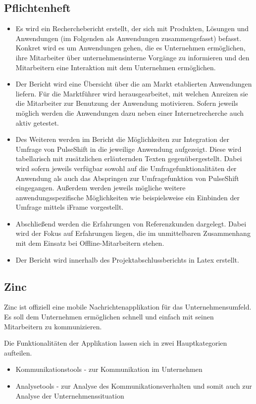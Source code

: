 \subsection{Pflichtenheft}
\begin{itemize}
\item Es wird ein Recherchebericht erstellt, der sich mit Produkten, Lösungen und Anwendungen (im Folgenden als Anwendungen zusammengefasst) befasst. Konkret wird es um Anwendungen gehen, die es Unternehmen ermöglichen, ihre Mitarbeiter über unternehmensinterne Vorgänge zu informieren und den Mitarbeitern eine Interaktion mit dem Unternehmen ermöglichen.
\item Der Bericht wird eine Übersicht über die am Markt etablierten Anwendungen liefern. Für die Marktführer wird herausgearbeitet, mit welchen Anreizen sie die Mitarbeiter zur Benutzung der Anwendung motivieren. Sofern jeweils möglich werden die Anwendungen dazu neben einer Internetrecherche auch aktiv getestet.
\item Des Weiteren werden im Bericht die Möglichkeiten zur Integration der Umfrage von PulseShift in die jeweilige Anwendung aufgezeigt. Diese wird tabellarisch mit zusätzlichen erläuternden Texten gegenübergestellt. Dabei wird sofern jeweils verfügbar sowohl auf die Umfragefunktionalitäten der Anwendung als auch das Abspringen zur Umfragefunktion von PulseShift eingegangen. Außerdem werden jeweils mögliche weitere anwendungsspezifische Möglichkeiten wie beispielsweise ein Einbinden der Umfrage mittels iFrame vorgestellt.
\item Abschließend werden die Erfahrungen von Referenzkunden dargelegt. Dabei wird der Fokus auf Erfahrungen liegen, die im unmittelbaren Zusammenhang mit dem Einsatz bei Offline-Mitarbeitern stehen.
\item Der Bericht wird innerhalb des Projektabschlussberichts in Latex erstellt.
\end{itemize}

\subsection{Zinc}
Zinc ist offiziell eine mobile Nachrichtenapplikation für das Unternehmensumfeld. Es soll dem Unternehmen ermöglichen schnell und einfach mit seinen Mitarbeitern zu kommunizieren. 

Die Funktionalitäten der Applikation lassen sich in zwei Hauptkategorien aufteilen. 

\begin{itemize}
\item Kommunikationstools - zur Kommunikation im Unternehmen 
\item Analysetools - zur Analyse des Kommunikationsverhalten und somit auch zur Analyse der Unternehmenssituation
\end{itemize}

